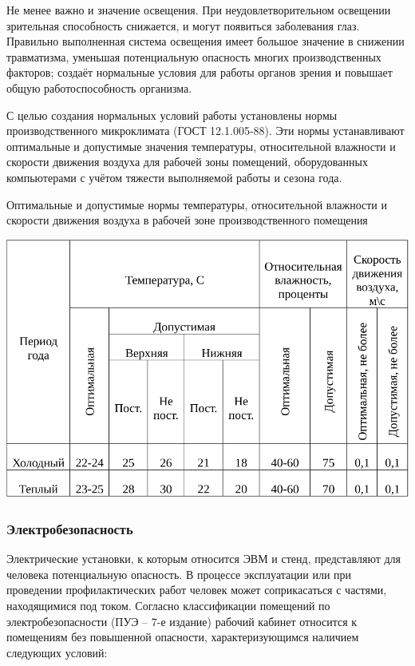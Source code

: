 Не менее важно и значение освещения. При неудовлетворительном освещении зрительная способность снижается, и могут появиться заболевания глаз. Правильно выполненная система освещения имеет большое значение в снижении травматизма, уменьшая потенциальную опасность многих производственных факторов; создаёт нормальные условия для работы органов зрения и повышает общую работоспособность организма.

С целью создания нормальных условий работы установлены нормы производственного микроклимата (ГОСТ 12.1.005-88)\cite{OT10}. Эти нормы устанавливают оптимальные и допустимые значения температуры, относительной влажности и скорости движения воздуха для рабочей зоны помещений, оборудованных компьютерами с учётом тяжести выполняемой работы и сезона года.

\begin{table}[!ht]
\caption{Оптимальные и допустимые нормы температуры, относительной влажности и скорости движения воздуха в рабочей зоне производственного помещения}
\centering
\includegraphics[width=1\linewidth]{voltage_amper.pdf}
\label{tab:micro_climat}
\end{table}

\subsubsection{Электробезопасность}

Электрические установки, к которым относится ЭВМ и стенд, представляют для человека потенциальную опасность. В процессе эксплуатации или при проведении профилактических работ человек может соприкасаться с частями, находящимися под током. Согласно классификации помещений по электробезопасности (ПУЭ – 7-е издание) рабочий кабинет относится к помещениям без повышенной опасности, характеризующимся наличием следующих условий:

